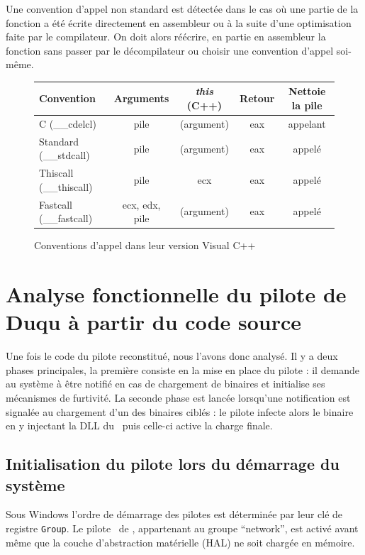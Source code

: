 Une convention d'appel non standard est détectée dans le cas où une partie de la fonction a été écrite directement en assembleur ou à la suite d'une optimisation faite par le compilateur. On doit alors réécrire, en partie en assembleur la fonction sans passer par le décompilateur ou choisir une convention d'appel soi-même.

\begin{figure}[h]
\begin{center}
\begin{tabular}{|l|c|c|c|c|}
\hline 
Convention & Arguments & \emph{this} (C++) & Retour & Nettoie la pile\\
\hline
C (\_\_cdelcl) & pile & (argument) & eax & appelant\\
Standard (\_\_stdcall) & pile & (argument) & eax & appelé\\
Thiscall (\_\_thiscall) & pile & ecx & eax & appelé\\
Fastcall (\_\_fastcall) & ecx, edx, pile & (argument) & eax & appelé\\
\hline
\end{tabular}
\end{center}
\caption{Conventions d'appel dans leur version Visual C++}
\label{fig:callingconvention}
\end{figure}


\section{Analyse fonctionnelle du pilote de Duqu à partir du code source}
Une fois le code du pilote reconstitué, nous l'avons donc analysé.
Il y a deux phases principales, la première consiste en la mise en place du pilote : il demande au système à être notifié en cas de chargement de binaires et initialise ses mécanismes de furtivité.
La seconde phase est lancée lorsqu'une notification est signalée au chargement d'un des binaires ciblés : le pilote infecte alors le binaire en y injectant la DLL du \duqu\ puis celle-ci active la charge finale.

\subsection{Initialisation du pilote lors du démarrage du système}
Sous Windows l'ordre de démarrage des pilotes est déterminée par leur clé de registre \texttt{Group}.
Le pilote \driver\ de \duqu, appartenant au groupe ``network'', est activé avant même que la couche d'abstraction matérielle (HAL) ne soit chargée en mémoire.

